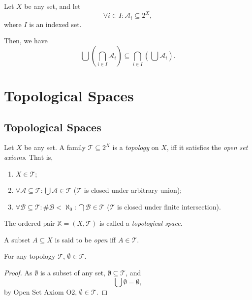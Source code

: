\begin{lemma}
	\label{lm: union of intersections of indexed families}
	Let $X$ be any set, and let
	$$
	\forall i \in I: \mathcal A_i \subseteq 2^X,
	$$
	where $I$ is an indexed set.
	
	Then, we have
	$$
	\bigcup \left( \bigcap_{i \in I} \mathcal A_i \right) \subseteq \bigcap_{i \in I} \left( \bigcup \mathcal A_i \right).
	$$
\end{lemma}



\chapter{Topological Spaces}


\section{Topological Spaces}


\begin{definition}
	\label{def: topological spaces}
	Let $X$ be any set. A family $\mathcal T \subseteq 2^X$ is a \textit{topology} on $X$, iff it satisfies the \textit{open set axioms}. That is,
	\begin{enumerate}[O1.]
		\item $X \in \mathcal T$;
		\item $\forall \mathcal A \subseteq \mathcal T: \bigcup \mathcal A \in \mathcal T$ ($\mathcal T$ is closed under arbitrary union);
		\item $\forall \mathcal B \subseteq \mathcal T: \#\mathcal B < \aleph_0: \bigcap \mathcal B \in \mathcal T$ ($\mathcal T$ is closed under finite intersection).
	\end{enumerate}
	
	The ordered pair $\mathbb X = (X, \mathcal T)$ is called a \textit{topological space}.
	
	A subset $A \subseteq X$ is said to be \textit{open} iff $A \in \mathcal T$.
\end{definition}


\begin{lemma}
	\label{lm: topological spaces: emptyset in topology}

	For any topology $\mathcal T$, $\emptyset \in \mathcal T$.
	
	\begin{proof}
		As $\emptyset$ is a subset of any set, $\emptyset \subseteq \mathcal T$, and
		$$
		\bigcup \emptyset = \emptyset,
		$$
		by Open Set Axiom O2, $\emptyset \in \mathcal T$.
	\end{proof}
\end{lemma}


